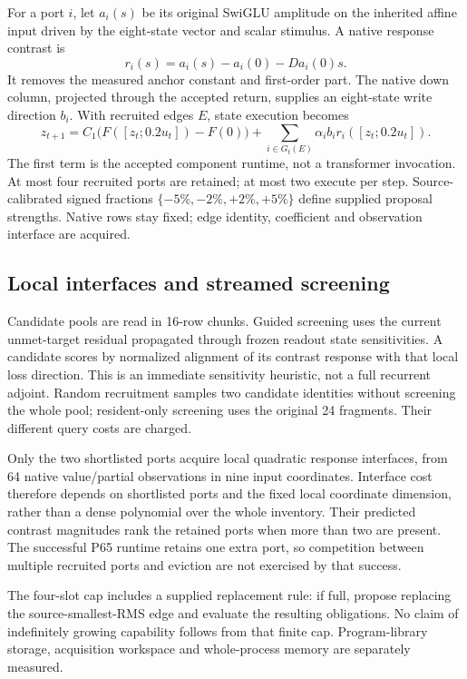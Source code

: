 \documentclass[11pt]{article}
\begin{document}
For a port $i$, let $a_i(s)$ be its original SwiGLU amplitude on the inherited affine input driven by the eight-state vector and scalar stimulus. A native response contrast is
\begin{equation}
 r_i(s)=a_i(s)-a_i(0)-D a_i(0)s.
\end{equation}
It removes the measured anchor constant and first-order part. The native down column, projected through the accepted return, supplies an eight-state write direction $b_i$. With recruited edges $E$, state execution becomes
\begin{equation}
 z_{t+1}=C_1\bigl(F([z_t;0.2u_t])-F(0)\bigr)
       +\sum_{i\in G_t(E)}\alpha_i b_i r_i([z_t;0.2u_t]).
\end{equation}
The first term is the accepted component runtime, not a transformer invocation. At most four recruited ports are retained; at most two execute per step. Source-calibrated signed fractions $\{-5\%,-2\%,+2\%,+5\%\}$ define supplied proposal strengths. Native rows stay fixed; edge identity, coefficient and observation interface are acquired.

\subsection{Local interfaces and streamed screening}
Candidate pools are read in 16-row chunks. Guided screening uses the current unmet-target residual propagated through frozen readout state sensitivities. A candidate scores by normalized alignment of its contrast response with that local loss direction. This is an immediate sensitivity heuristic, not a full recurrent adjoint. Random recruitment samples two candidate identities without screening the whole pool; resident-only screening uses the original 24 fragments. Their different query costs are charged.

Only the two shortlisted ports acquire local quadratic response interfaces, from 64 native value/partial observations in nine input coordinates. Interface cost therefore depends on shortlisted ports and the fixed local coordinate dimension, rather than a dense polynomial over the whole inventory. Their predicted contrast magnitudes rank the retained ports when more than two are present. The successful P65 runtime retains one extra port, so competition between multiple recruited ports and eviction are not exercised by that success.

The four-slot cap includes a supplied replacement rule: if full, propose replacing the source-smallest-RMS edge and evaluate the resulting obligations. No claim of indefinitely growing capability follows from that finite cap. Program-library storage, acquisition workspace and whole-process memory are separately measured.
\end{document}
